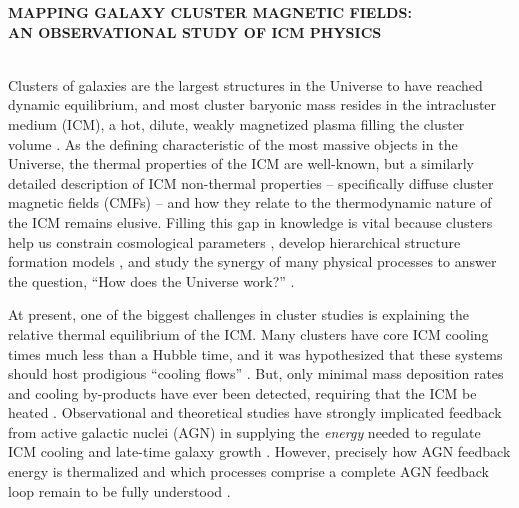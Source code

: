 \documentclass[letterpaper,12pt]{article}
\begin{document}
\begin{center}
  {\bf\uppercase{mapping galaxy cluster magnetic fields:\\an
      observational study of icm physics}}
\end{center}

\citep{2009IEEEP..97.1448P}

\\
\indent Clusters of galaxies are the largest structures in the
Universe to have reached dynamic equilibrium, and most cluster
baryonic mass resides in the intracluster medium (ICM), a hot, dilute,
weakly magnetized plasma filling the cluster volume
\citep{sarazinbook}. As the defining characteristic of the most
massive objects in the Universe, the thermal properties of the ICM are
well-known, but a similarly detailed description of ICM non-thermal
properties -- specifically diffuse cluster magnetic fields (CMFs) --
and how they relate to the thermodynamic nature of the ICM remains
elusive. Filling this gap in knowledge is vital because clusters help
us constrain cosmological parameters \citep{voitreview}, develop
hierarchical structure formation models \citep{1995MNRAS.275...56N},
and study the synergy of many physical processes to answer the
question, ``How does the Universe work?''
\citep{2004cgpc.conf.....M}.

At present, one of the biggest challenges in cluster studies is
explaining the relative thermal equilibrium of the ICM. Many clusters
have core ICM cooling times much less than a Hubble time, and it was
hypothesized that these systems should host prodigious ``cooling
flows'' \citep{fabiancfreview}. But, only minimal mass deposition
rates and cooling by-products have ever been detected, requiring that
the ICM be heated \citep{cfreview}. Observational and theoretical
studies have strongly implicated feedback from active galactic nuclei
(AGN) in supplying the {\it{energy}} needed to regulate ICM cooling
and late-time galaxy growth \citep{mcnamrev}. However, precisely how
AGN feedback energy is thermalized and which processes comprise a
complete AGN feedback loop remain to be fully understood
\citep{2010ApJ...710..743D}.
\end{document}
